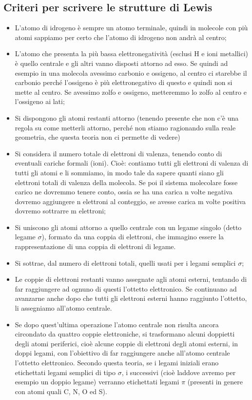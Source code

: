 \subsection{Criteri per scrivere le strutture di Lewis}
\begin{itemize}
    \item L'atomo di idrogeno è sempre un atomo terminale, quindi in molecole con più atomi sappiamo per certo che l'atomo di idrogeno non andrà al centro;
    \item L'atomo che presenta la più bassa elettronegatività (esclusi H e ioni metallici) è quello centrale e gli altri vanno disposti attorno ad esso. Se quindi ad esempio in una molecola avessimo carbonio e ossigeno, al centro ci starebbe il carbonio perché l'ossigeno è più elettronegativo di questo e quindi non si mette al centro. Se avessimo zolfo e ossigeno, metteremmo lo zolfo al centro e l'ossigeno ai lati;
    \item Si dispongono gli atomi restanti attorno (tenendo presente che non c'è una regola su come metterli attorno, perché non stiamo ragionando sulla reale geometria, che questa teoria non ci permette di vedere)
    \item Si considera il numero totale di elettroni di valenza, tenendo conto di eventuali cariche formali (ioni). Cioè: contiamo tutti gli elettroni di valenza di tutti gli atomi e li sommiamo, in modo tale da sapere quanti siano gli elettroni totali di valenza della molecola. Se poi il sistema molecolare fosse carico ne dovremmo tenere conto, ossia se ha una carica n volte negativa dovremo aggiungere n elettroni al conteggio, se avesse carica m volte positiva dovremo sottrarre m elettroni;
    \item Si uniscono gli atomi attorno a quello centrale con un legame singolo (detto legame $\sigma$), formato da una coppia di elettroni, che immagino essere la rappresentazione di una coppia di elettroni di legame. 
    \item Si sottrae, dal numero di elettroni totali, quelli usati per i legami semplici $\sigma$;
    \item Le coppie di elettroni restanti vanno assegnate agli atomi esterni, tentando di far raggiungere ad ognuno di questi l'ottetto elettronico. Se continuano ad avanzarne anche dopo che tutti gli elettroni esterni hanno raggiunto l'ottetto, li assegniamo all'atomo centrale.
    \item Se dopo quest'ultima operazione l'atomo centrale non risulta ancora circondato da quattro coppie elettroniche, si trasformano alcuni doppietti degli atomi periferici, cioè alcune coppie di elettroni degli atomi esterni, in doppi legami, con l'obiettivo di far raggiungere anche all'atomo centrale l'ottetto elettronico. Secondo questa teoria, se i  legami iniziali erano etichettati legami semplici di tipo $\sigma$, i successivi (cioè laddove avremo per esempio un doppio legame) verranno etichettati legami $\pi$ (presenti in genere con atomi quali C, N, O ed S).
\end{itemize}

